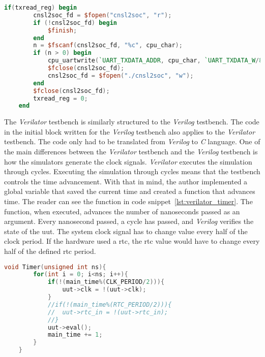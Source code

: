 \begin{lstlisting}[language=Verilog, caption={Write byte from \textit{Console} to \acrshort{soc}.}, label=lst:write2soc]
    if(txread_reg) begin
        cnsl2soc_fd = $fopen("cnsl2soc", "r");
        if (!cnsl2soc_fd) begin
            $finish;
        end
        n = $fscanf(cnsl2soc_fd, "%c", cpu_char);
        if (n > 0) begin
            cpu_uartwrite(`UART_TXDATA_ADDR, cpu_char, `UART_TXDATA_W/8);
            $fclose(cnsl2soc_fd);
            cnsl2soc_fd = $fopen("./cnsl2soc", "w");
        end
        $fclose(cnsl2soc_fd);
        txread_reg = 0;
    end
\end{lstlisting}

The \textit{Verilator} testbench is similarly structured to the \textit{Verilog} testbench. The code in the initial block written for the \textit{Verilog} testbench also applies to the \textit{Verilator} testbench. The code only had to be translated from \textit{Verilog} to \textit{C} language. One of the main differences between the \textit{Verilator} testbench and the \textit{Verilog} testbench is how the simulators generate the clock signals. \textit{Verilator} executes the simulation through cycles. Executing the simulation through cycles means that the testbench controls the time advancement. With that in mind, the author implemented a global variable that saved the current time and created a function that advances time. The reader can see the function in code snippet~\ref{lst:verilator_timer}. The function, when executed, advances the number of nanoseconds passed as an argument. Every nanosecond passed, a cycle has passed, and \textit{Verilog} verifies the state of the \acrfull{uut}. The system clock signal has to change value every half of the clock period. If the hardware used a \acrshort{rtc}, the \acrshort{rtc} value would have to change every half of the defined \acrlong{rtc} period.

\begin{lstlisting}[language=C, caption={\textit{Verilator} Timer function.}, label=lst:verilator_timer]
    void Timer(unsigned int ns){
        for(int i = 0; i<ns; i++){
            if(!(main_time%(CLK_PERIOD/2))){
                uut->clk = !(uut->clk);
            }
            //if(!(main_time%(RTC_PERIOD/2))){
            //  uut->rtc_in = !(uut->rtc_in);
            //}
            uut->eval();
            main_time += 1;
        }
    }
\end{lstlisting}

